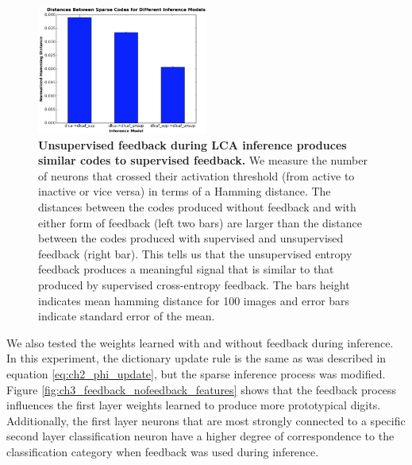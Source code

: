 \begin{figure}
    \centering
    \includegraphics[width=0.5\textwidth]{figures/feedback_code_distances.png}
    \caption{\textbf{Unsupervised feedback during LCA inference produces similar codes to supervised feedback.} We measure the number of neurons that crossed their activation threshold (from active to inactive or vice versa) in terms of a Hamming distance. The distances between the codes produced without feedback and with either form of feedback (left two bars) are larger than the distance between the codes produced with supervised and unsupervised feedback (right bar). This tells us that the unsupervised entropy feedback produces a meaningful signal that is similar to that produced by supervised cross-entropy feedback. The bars height indicates mean hamming distance for 100 images and error bars indicate standard error of the mean.}
    \label{fig:ch3_feedback_code_distances}
\end{figure}

We also tested the weights learned with and without feedback during inference. In this experiment, the dictionary update rule is the same as was described in equation \ref{eq:ch2_phi_update}, but the sparse inference process was modified. Figure \ref{fig:ch3_feedback_nofeedback_features} shows that the feedback process influences the first layer weights learned to produce more prototypical digits. Additionally, the first layer neurons that are most strongly connected to a specific second layer classification neuron have a higher degree of correspondence to the classification category when feedback was used during inference.

